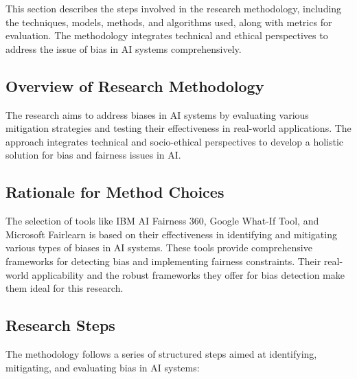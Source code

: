 \documentclass[a4paper, 12pt]{article}
\begin{document}
This section describes the steps involved in the research methodology, including the techniques, models, methods, and algorithms used, along with metrics for evaluation. The methodology integrates technical and ethical perspectives to address the issue of bias in AI systems comprehensively.

\subsection{Overview of Research Methodology}
The research aims to address biases in AI systems by evaluating various mitigation strategies and testing their effectiveness in real-world applications. The approach integrates technical and socio-ethical perspectives to develop a holistic solution for bias and fairness issues in AI. \\

\subsection{Rationale for Method Choices}
The selection of tools like IBM AI Fairness 360, Google What-If Tool, and Microsoft Fairlearn is based on their effectiveness in identifying and mitigating various types of biases in AI systems. These tools provide comprehensive frameworks for detecting bias and implementing fairness constraints. Their real-world applicability and the robust frameworks they offer for bias detection make them ideal for this research.
\\
\subsection{Research Steps}
The methodology follows a series of structured steps aimed at identifying, mitigating, and evaluating bias in AI systems:
\end{document}
